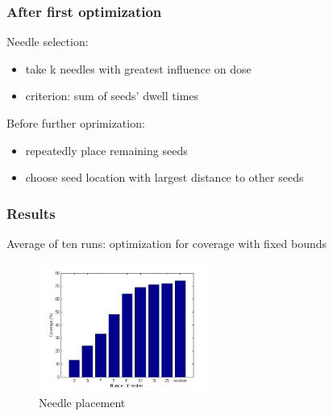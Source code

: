 \documentclass{beamer}
\begin{document}
	\begin{frame}
	\frametitle{After first optimization}
		Needle selection:
		\begin{itemize}
		\item take k needles with greatest influence on dose
		\item criterion: sum of seeds' dwell times
		\end{itemize}
		Before further oprimization:
		\begin{itemize}
		\item repeatedly place remaining seeds
		\item choose seed location with largest distance to other seeds
		\end{itemize}
	\end{frame}
	\begin{frame}
	\frametitle{Results}
		Average of ten runs: optimization for coverage with fixed bounds
		\begin{figure}[h]
		\centering
		\includegraphics[width=0.5\textwidth]{pictures/histogramm_nadeln}
		\caption{Needle placement}
		\end{figure}
	\end{frame}


	 
\end{document}
